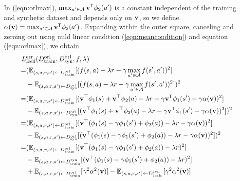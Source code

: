 In (\ref{eqn:orlmax}), $\max_{a' \in \mathcal{A}} \mathbf{v}^{\sf{T}}\phi_2(a')$ is a constant independent of the training and synthetic dataset and depends only on ${\mathbf{v}}$, so we define $\alpha({\mathbf{v}}) = \max_{a' \in \mathcal{A}} \mathbf{v}^{\sf{T}}\phi_2(a')$. Expanding within the outer square, canceling and zeroing out using mild linear condition (\ref{eqn:meancondition}) and equation (\ref{eqn:orlmax}), we obtain
\begin{align}
L&_{\textnormal{Bell}}^{\textnormal{err}}(D_{\textnormal{train}}^{\textnormal{orl}}, D_{\textnormal{syn}}^{\textnormal{orl}}, f, \lambda) \nonumber \\
=& (\E_{(s,a, r,s') \leftarrow D_{\textnormal{train}}^{\textnormal{orl}}}[(f(s,a) - \lambda r - \gamma \max_{a' \in \mathcal{A}} f(s',a'))^2] \nonumber \\
&- \E_{(s, a, r, s') \leftarrow D_{\textnormal{syn}}^{\textnormal{orl}}}[(f(s, a) - \lambda r - \gamma \max_{a' \in \mathcal{A}} f(s',a'))^2])^2 \nonumber \\
=& (\E_{(s,a, r,s') \leftarrow D_{\textnormal{train}}^{\textnormal{orl}}}[(\bv^\top \phi_1(s) + \bv^\top \phi_2(a) - \lambda r - \gamma \mathbf{v}^{\sf{T}}\phi_1(s') -\gamma \alpha(\bv) )^2] \nonumber \\
&- \E_{(s,a, r,s') \leftarrow D_{\textnormal{syn}}^{\textnormal{orl}}}[(\bv^\top \phi_1(s) + \bv^\top \phi_2(a) - \lambda r - \gamma \mathbf{v}^{\sf{T}}\phi_1(s') -\gamma \alpha(\bv) )^2])^2 \nonumber \\
=& (\E_{(s,a, r,s') \leftarrow D_{\textnormal{train}}^{\textnormal{orl}}}[(\bv^\top (\phi_1(s)- \gamma \phi_1(s') + \phi_2(a)) - \lambda r  -\gamma \alpha(\bv) )^2] \nonumber \\
&- \E_{(s,a, r,s') \leftarrow D_{\textnormal{syn}}^{\textnormal{orl}}}[(\bv^\top (\phi_1(s)- \gamma \phi_1(s') + \phi_2(a)) - \lambda r  -\gamma \alpha(\bv) )^2])^2 \nonumber \\
=& (
\E_{(s,a, r,s') \leftarrow D_{\textnormal{train}}^{\textnormal{orl}}}[(\bv^\top (\phi_1(s)- \gamma \phi_1(s') + \phi_2(a)) - \lambda r)^2 ]\nonumber \\
&- \E_{(s,a, r,s') \leftarrow D_{\textnormal{train}}^{\textnormal{syn}}}[(\bv^\top (\phi_1(s)- \gamma \phi_1(s') + \phi_2(a)) - \lambda r)^2]  \nonumber \\
& +\E_{(s,a, r,s') \leftarrow D_{\textnormal{train}}^{\textnormal{orl}}}[\gamma^2 \alpha^2(\bv)]
-\E_{(s,a, r,s') \leftarrow D_{\textnormal{train}}^{\textnormal{syn}}}[\gamma^2 \alpha^2(\bv)]\nonumber \\

\end{align}
